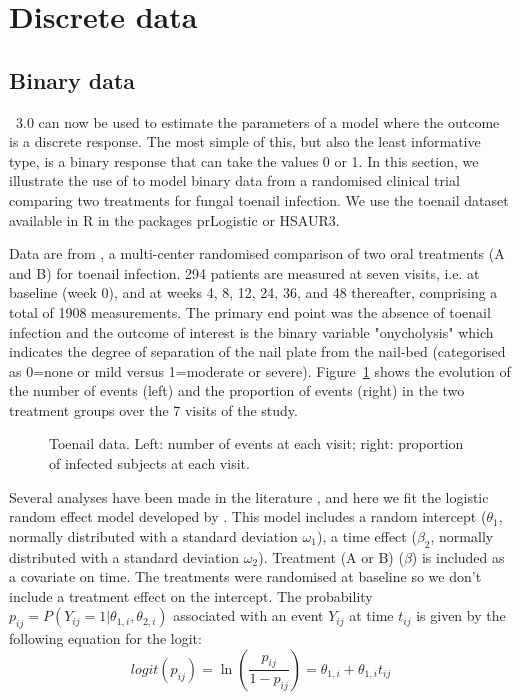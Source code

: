 
\section{Discrete data}

\subsection{Binary data} \label{sec:toenail}

\monolix~3.0 can now be used to estimate the parameters of a model where the outcome is a discrete response. The most simple of this, but also the least informative type, is a binary response that can take the values 0 or 1. In this section, we illustrate the use of \monolix to model binary data from a randomised clinical trial comparing two treatments for fungal toenail infection. We use the {\sf toenail} dataset available in {\sf R} in the packages {\sf prLogistic} or {\sf HSAUR3}.

Data are from \cite{debacker_toenail}, a multi-center randomised comparison  of two oral treatments (A and B) for toenail infection. 294 patients are measured at seven visits, i.e. at baseline (week 0), and at weeks 4, 8, 12, 24, 36, and 48 thereafter, comprising a total of 1908 measurements. The primary end point was the absence of toenail infection and the outcome of interest is the binary variable "onycholysis" which indicates the degree of separation of the nail plate from the nail-bed (categorised as 0=none or mild versus 1=moderate or severe). Figure~\ref{fig:toenailData} shows the evolution of the number of events (left) and the proportion of events (right) in the two treatment groups over the 7 visits of the study.

\begin{figure}[!h]
\begin{center}
\end{center}
\par \kern -0.5cm
\caption{Toenail data. Left: number of events at each visit; right: proportion of infected subjects at each visit.} \label{fig:toenailData}
\end{figure}

Several analyses have been made in the literature \cite{lesaffre2001effect,lin2011goodness}, and here we fit the logistic random effect model developed by \cite{hedeker1994random}. This model includes a random intercept ($\theta_1$, normally distributed with a standard deviation $\omega_1$),  a time effect ($\beta_2$, normally distributed with a standard deviation $\omega_2$). Treatment (A or B) ($\beta$) is included as a covariate on time. The treatments were randomised at baseline so we don't include a treatment effect on the intercept. The probability $p_{ij}=P(Y_{ij}=1 | \theta_{1,i}, \theta_{2,i})$ associated with an event $Y_{ij}$ at time $t_{ij}$ is given by the following equation for the logit:
\begin{equation}
logit(p_{ij}) = \ln \left( \frac{p_{ij}}{1-p_{ij}} \right) = \theta_{1,i} + \theta_{1,i} t_{ij} \label{eq:logit}
\end{equation}

